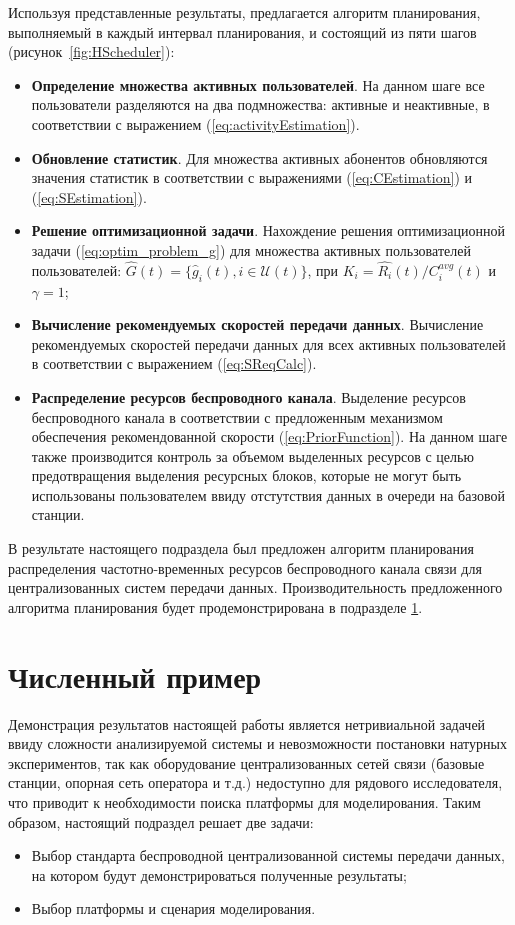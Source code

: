 Используя представленные результаты, предлагается алгоритм планирования, выполняемый в каждый интервал планирования, и состоящий из пяти шагов (рисунок~\ref{fig:HScheduler}):
\begin{itemize}
	\item \textbf{Определение множества активных пользователей}. На данном шаге все пользователи разделяются на два подмножества: активные и неактивные, в соответствии с выражением (\ref{eq:activityEstimation}).
	\item \textbf{Обновление статистик}. Для множества активных абонентов обновляются значения статистик в соответствии с выражениями (\ref{eq:CEstimation}) и (\ref{eq:SEstimation}).
	\item \textbf{Решение оптимизационной задачи}. Нахождение решения оптимизационной задачи (\ref{eq:optim_problem_g}) для множества активных пользователей пользователей: $\hat{G}(t) = \{\hat{g}_i(t), i \in \mathcal{U}(t)\}$, при $K_i = \hat{R_i}(t) / C^{avg}_i(t)$ и $\gamma = 1$;
	\item \textbf{Вычисление рекомендуемых скоростей передачи данных}. Вычисление рекомендуемых скоростей передачи данных для всех активных пользователей в соответствии с выражением (\ref{eq:SReqCalc}).
	\item \textbf{Распределение ресурсов беспроводного канала}. Выделение ресурсов беспроводного канала в соответствии с предложенным механизмом обеспечения рекомендованной скорости (\ref{eq:PriorFunction}). На данном шаге также производится контроль за объемом выделенных ресурсов с целью предотвращения выделения ресурсных блоков, которые не могут быть использованы пользователем ввиду отстутствия данных в очереди на базовой станции.
\end{itemize}

В результате настоящего подраздела был предложен алгоритм планирования распределения частотно-временных ресурсов беспроводного канала связи для централизованных систем передачи данных. Производительность предложенного алгоритма планирования будет продемонстрирована в подразделе \ref{chap3:NumericalExample}.

\section{Численный пример}
\label{chap3:NumericalExample}

Демонстрация результатов настоящей работы является нетривиальной задачей ввиду сложности анализируемой системы и невозможности постановки натурных экспериментов, так как оборудование централизованных сетей связи (базовые станции, опорная сеть оператора и т.д.) недоступно для рядового исследователя, что приводит к необходимости поиска платформы для моделирования. Таким образом, настоящий подраздел решает две задачи:
\begin{itemize}
	\item Выбор стандарта беспроводной централизованной системы передачи данных, на котором будут демонстрироваться полученные результаты;
	\item Выбор платформы и сценария моделирования.
\end{itemize}


